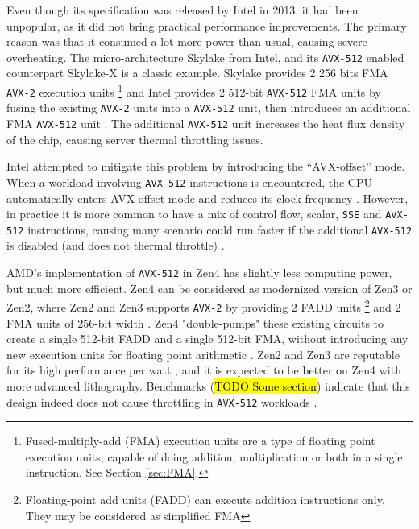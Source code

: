 \documentclass[logo,bsc,singlespacing,parskip]{infthesis}
\begin{document}

Even though its specification was released by Intel in 2013, it had been
unpopular, as it did not bring practical performance improvements. The primary
reason was that it consumed a lot more power than usual, causing severe
overheating. The micro-architecture Skylake from Intel, and its \texttt{AVX-512} enabled
counterpart Skylake-X is a classic example. Skylake provides 2 256 bits FMA
\texttt{AVX-2} execution units 
\footnote{Fused-multiply-add (FMA) execution units are a type of
floating point execution units, capable of doing addition, multiplication or
both in a single instruction. See Section \ref{sec:FMA}.} 
and Intel provides 2 512-bit \texttt{AVX-512} FMA units by
fusing the existing \texttt{AVX-2}  units into a \texttt{AVX-512} unit, then introduces an
additional FMA \texttt{AVX-512} unit \cite{SLK-X}. The additional \texttt{AVX-512} unit increases
the heat flux density of the chip, causing server thermal throttling issues. 

Intel attempted to mitigate this problem by introducing the ``AVX-offset'' mode.
When a workload involving \texttt{AVX-512} instructions is encountered, the CPU
automatically enters AVX-offset mode and reduces its clock frequency
\cite{AVX-offset}. However, in practice it is more common to have a mix of
control flow, scalar, \texttt{SSE} and \texttt{AVX-512} instructions, causing
many scenario could run faster if the additional \texttt{AVX-512} is disabled
(and does not thermal throttle) \cite{Zen4Critique}.

AMD’s implementation of \texttt{AVX-512} in Zen4 has slightly less computing power, but
much more efficient. Zen4 can be considered as modernized version of Zen3 or
Zen2, where Zen2 and Zen3 supports \texttt{AVX-2}  by providing 2 FADD units
\footnote{Floating-point add units (FADD) can execute addition instructions
only. They may be considered as simplified FMA} and 2 FMA units of 256-bit width
\cite{Zen2ChipWiki}. Zen4 "double-pumps" these existing circuits to create a
single 512-bit FADD and a single 512-bit FMA, without introducing any new
execution units for floating point arithmetic \cite{Zen4Critique}. Zen2 and Zen3
are reputable for its high performance per watt \cite{ZenPerfPerWatt}, and it is
expected to be better on Zen4 with more advanced lithography. Benchmarks
(\hl{TODO Some section}) indicate that this design indeed does not cause
throttling in \texttt{AVX-512} workloads \cite{Zen4Critique}.
\end{document}
